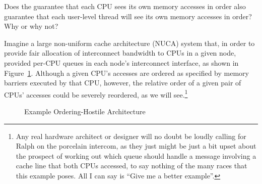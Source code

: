 \QuickQuiz{}
	Does the guarantee that each CPU sees its own memory accesses
	in order also guarantee that each user-level thread will see
	its own memory accesses in order?
	Why or why not?
 \QuickQuizEnd

Imagine a large non-uniform cache architecture (NUCA) system that,
in order to provide fair allocation
of interconnect bandwidth to CPUs in a given node, provided per-CPU
queues in each node's interconnect interface, as shown in
Figure~\ref{fig:app:whymb:Example Ordering-Hostile Architecture}.
Although a given CPU's accesses are ordered as specified by memory
barriers executed by that CPU, however, the relative order of a
given pair of CPUs' accesses could be severely reordered,
as we will see.\footnote{
	Any real hardware architect or designer will no doubt be
	loudly calling for Ralph on the porcelain intercom,
	as they just might be just a bit upset about the prospect of working
	out which queue should handle a message involving a cache line
	that both CPUs accessed, to say nothing of the many races that
	this example poses.
	All I can say is ``Give me a better example''.}

\begin{figure}[htb]
\begin{center}
\end{center}
\caption{Example Ordering-Hostile Architecture}
\label{fig:app:whymb:Example Ordering-Hostile Architecture}
\end{figure}

